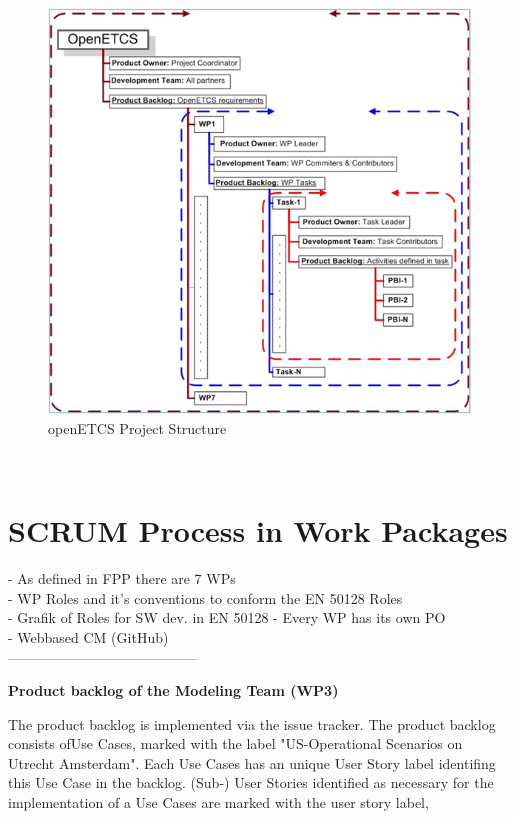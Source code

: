 \begin{figure}[h]
	\centering
	\includegraphics[scale=0.6]{./images/openetcs__scrum.png}
	\caption{openETCS Project Structure}
\end{figure}

 \\

\section{SCRUM Process in Work Packages}

- As defined in FPP there are 7 WPs\\
- WP Roles and it's conventions to conform the EN 50128 Roles\\
- Grafik of Roles for SW dev. in EN 50128 
- Every WP has its own PO\\
- Webbased CM (GitHub)\\
-----------------------------------------


\textbf{Product backlog of the Modeling Team (WP3)}

The product backlog is implemented via the issue tracker.
The product backlog consists ofUse Cases, marked with the label "US-Operational Scenarios on Utrecht Amsterdam".
Each Use Cases has an unique User Story label identifing this Use Case in the backlog.
(Sub-) User Stories identified as necessary for the implementation of a Use Cases are marked with the user story label,

